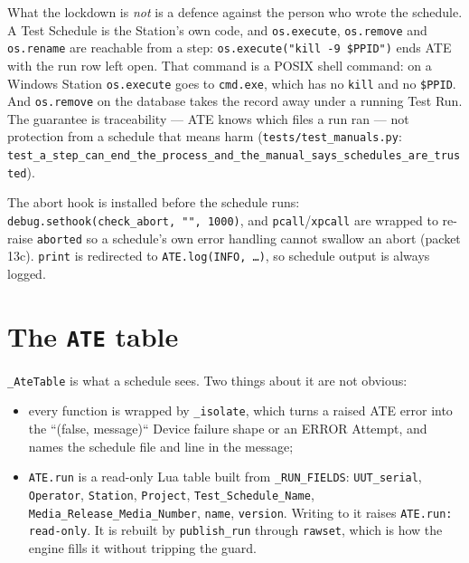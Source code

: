 What the lockdown is \emph{not} is a defence against the person who wrote the schedule. A Test
Schedule is the Station's own code, and \texttt{os.execute}, \texttt{os.remove} and \texttt{os.rename}
are reachable from a step: \texttt{os.execute("kill -9 \$PPID")} ends ATE with the run row left open.
That command is a POSIX shell command: on a Windows Station \texttt{os.execute} goes to
\texttt{cmd.exe}, which has no \texttt{kill} and no \texttt{\$PPID}. And \texttt{os.remove} on the
database takes the record away under a running Test Run. The guarantee
is traceability --- ATE knows which files a run ran --- not protection from a schedule that means
harm (\texttt{tests/\allowbreak{}test\_\allowbreak{}manuals.py}:
\texttt{test\_\allowbreak{}a\_\allowbreak{}step\_\allowbreak{}can\_\allowbreak{}end\_\allowbreak{}the\_\allowbreak{}process\_\allowbreak{}and\_\allowbreak{}the\_\allowbreak{}manual\_\allowbreak{}says\_\allowbreak{}schedules\_\allowbreak{}are\_\allowbreak{}trusted}).

The abort hook is installed before the schedule runs: \texttt{debug.sethook(check\_\allowbreak{}abort, "", 1000)}, and
\texttt{pcall}/\texttt{xpcall} are wrapped to re-raise \texttt{aborted} so a schedule's own error handling
cannot swallow an abort (packet 13c). \texttt{print} is redirected to \texttt{ATE.log(INFO, \dots)}, so
schedule output is always logged.

\section{The \texttt{ATE} table}

\texttt{\_AteTable} is what a schedule sees. Two things about it are not obvious:

\begin{itemize}
  \item every function is wrapped by \texttt{\_isolate}, which turns a raised ATE error into the
    ``(false, message)`` Device failure shape or an ERROR Attempt, and names the schedule file and line
    in the message;
  \item \texttt{ATE.run} is a read-only Lua table built from \texttt{\_RUN\_FIELDS}:
    \texttt{UUT\_serial}, \texttt{Operator}, \texttt{Station}, \texttt{Project},
    \texttt{Test\_Schedule\_Name}, \texttt{Media\_\allowbreak{}Release\_\allowbreak{}Media\_\allowbreak{}Number}, \texttt{name}, \texttt{version}.
    Writing to it raises \texttt{ATE.run: read-only}. It is rebuilt by \texttt{publish\_run} through
    \texttt{rawset}, which is how the engine fills it without tripping the guard.
\end{itemize}

